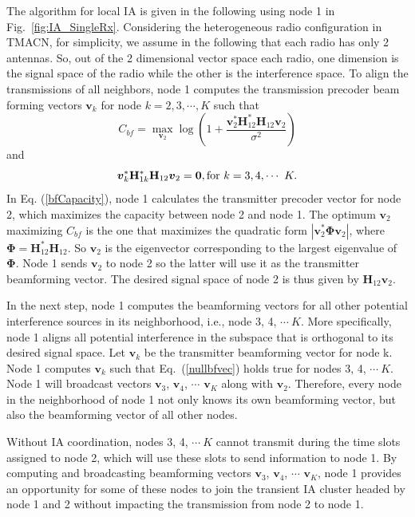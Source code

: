 \documentclass[letterpaper,11pt]{article}
\begin{document}
The algorithm for local IA is given in the following using node 1 in Fig.~\ref{fig:IA_SingleRx}. Considering the heterogeneous radio configuration in TMACN, for simplicity, we assume in the following that each radio has only 2 antennas. So, out of the 2 dimensional vector space each radio, one dimension is the signal space of the radio while the other is the interference space. To align the transmissions of all neighbors, node 1 computes the transmission precoder beam forming vectors ${\boldsymbol{v}}_k$ for node $k=2, 3, \cdots, K$ such that
\begin{equation}\label{bfCapacity}
C_{bf}=\displaystyle\max_{{\boldsymbol{v}}_2}\log\left(1+\frac{\boldsymbol{v}_2^{*}\mathbf{H}_{12}^{*}\mathbf{H}_{12}\boldsymbol{v}_2}{\sigma^2}\right)
\end{equation}
and
\begin{equation}\label{nullbfvec}
\boldsymbol{v}_k^{*}\mathbf{H}_{1k}^{*}\mathbf{H}_{12}\boldsymbol{v}_2=\mathbf{0}, {\rm{for}}~k=3,4,\cdots~K.
\end{equation}
In Eq. (\ref{bfCapacity}), node 1 calculates the transmitter precoder vector for node 2, which maximizes the capacity between node 2 and node 1. The optimum $\boldsymbol{v}_2$ maximizing $C_{bf}$ is the one that maximizes the quadratic form $|\boldsymbol{v}_2^*\boldsymbol{\Phi}\boldsymbol{v}_2|$, where $\boldsymbol{\Phi}=\mathbf{H}_{12}^{*}\mathbf{H}_{12}$. So $\boldsymbol{v}_2$ is the eigenvector corresponding to the largest eigenvalue of $\boldsymbol{\Phi}$. Node 1 sends $\boldsymbol{v}_2$ to node 2 so the latter will use it as the transmitter beamforming vector. The desired signal space of node 2 is thus given by $\mathbf{H}_{12}\boldsymbol{v}_2$. 

In the next step, node 1 computes the beamforming vectors for all other potential interference sources in its neighborhood, i.e., node 3, 4, $\cdots~K$. More specifically, node 1 aligns all potential interference in the subspace that is orthogonal to its desired signal space. Let $\boldsymbol{v}_k$ be the transmitter beamforming vector for node k. Node 1 computes $\boldsymbol{v}_k$ such that Eq.~(\ref{nullbfvec}) holds true for nodes 3, 4, $\cdots~K$. Node 1 will broadcast vectors $\boldsymbol{v}_3$, $\boldsymbol{v}_4$, $\cdots$ $\boldsymbol{v}_K$ along with $\boldsymbol{v}_2$. Therefore, every node in the neighborhood of node 1 not only knows its own beamforming vector, but also the beamforming vector of all other nodes.

Without IA coordination, nodes 3, 4, $\cdots~K$ cannot transmit during the time slots assigned to node 2, which will use these slots to send information to node 1. By computing and broadcasting beamforming vectors $\boldsymbol{v}_3$, $\boldsymbol{v}_4$, $\cdots$ $\boldsymbol{v}_K$, node 1 provides an opportunity for some of these nodes to join the transient IA cluster headed by node 1 and 2 without impacting the transmission from node 2 to node 1. 
\end{document}
